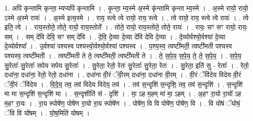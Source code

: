 \documentclass[17pt]{extarticle}
\begin{document}
1. अपि॑ कृन्तामि कृन्ता॒ म्यप्यपि॑ कृन्तामि । . कृ॒न्ता॒ म्य॒स्मे अ॒स्मे कृ॑न्तामि कृन्ता म्य॒स्मे । . अ॒स्मे रायो॒ रायो॒ ऽस्मे अ॒स्मे रायः॑ । . अ॒स्मे इत्य॒स्मे । . राय॒ स्त्वे त्वे रायो॒ राय॒ स्त्वे । . त्वे रायो॒ राय॒ स्त्वे त्वे रायः॑ । . त्वे इति॒ त्वे । . राय॒स्तोते॒ तोते॒ रायो॒ राय॒स्तोते᳚ । . तोते॒ रायो॒ राय॒स्तोते॒ तोते॒ रायः॑ । . रायः॒ सꣳ सꣳ रायो॒ रायः॒ सम् । . सम् दे॑वि देवि॒ सꣳ सम् दे॑वि । . दे॒वि॒ दे॒व्या दे॒व्या दे॑वि देवि दे॒व्या । . दे॒व्योर्वश्यो॒र्वश्या॑ दे॒व्या दे॒व्योर्वश्या᳚ । . उ॒र्वश्या॑ पश्यस्व पश्यस्वो॒र्वश्यो॒र्वश्या॑ पश्यस्व । . प॒श्य॒स्व॒ त्वष्टी॑मती॒ त्वष्टी॑मती पश्यस्व पश्यस्व॒ त्वष्टी॑मती । . त्वष्टी॑मती ते ते॒ त्वष्टी॑मती॒ त्वष्टी॑मती ते । . ते॒ स॒पे॒य॒ स॒पे॒य॒ ते॒ ते॒ स॒पे॒य॒ । . स॒पे॒य॒ सु॒रेताः᳚ सु॒रेताः᳚ सपेय सपेय सु॒रेताः᳚ । . सु॒रेता॒ रेतो॒ रेतः॑ सु॒रेताः᳚ सु॒रेता॒ रेतः॑ । . सु॒रेता॒ इति॑ सु - रेताः᳚ । . रेतो॒ दधा॑ना॒ दधा॑ना॒ रेतो॒ रेतो॒ दधा॑ना । . दधा॑ना वी॒रं ॅवी॒रम् दधा॑ना॒ दधा॑ना वी॒रम् । . वी॒रं ॅवि॑देय विदेय वी॒रं ॅवी॒रं ॅवि॑देय । . वि॒दे॒य॒ तव॒ तव॑ विदेय विदेय॒ तव॑ । . तव॑ स॒न्दृशि॑ स॒न्दृशि॒ तव॒ तव॑ स॒न्दृशि॑ । . स॒न्दृशि॑ मा मा स॒न्दृशि॑ स॒न्दृशि॑ मा । . स॒न्दृशीति॑ सं - दृशि॑ । . मा॒ ऽह म॒हम् मा॑ मा॒ ऽहम् । . अ॒हꣳ रा॒यो रा॒यो॑ ऽह म॒हꣳ रा॒यः । . रा॒य स्पोषे॑ण॒ पोषे॑ण रा॒यो रा॒य स्पोषे॑ण । . पोषे॑ण॒ वि वि पोषे॑ण॒ पोषे॑ण॒ वि । . वि यो॑षं ॅयोषं॒ ॅवि वि यो॑षम् । . यो॒ष॒मिति॑ योषम् । \newline
\end{document}
